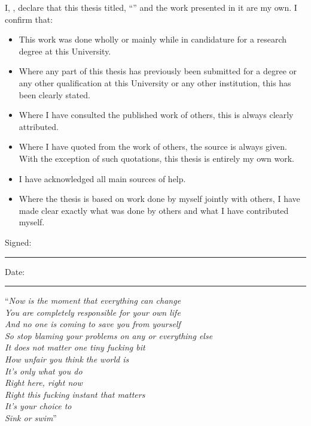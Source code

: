 \documentclass[
11pt, %
english, %
singlespacing, %
headsepline, %
]{MastersDoctoralThesis} %
\begin{document}

\begin{declaration}
\addchaptertocentry{\authorshipname} %
\noindent I, \authorname, declare that this thesis titled, \enquote{\ttitle} and the work presented in it are my own. I confirm that:

\begin{itemize} 
\item This work was done wholly or mainly while in candidature for a research degree at this University.
\item Where any part of this thesis has previously been submitted for a degree or any other qualification at this University or any other institution, this has been clearly stated.
\item Where I have consulted the published work of others, this is always clearly attributed.
\item Where I have quoted from the work of others, the source is always given. With the exception of such quotations, this thesis is entirely my own work.
\item I have acknowledged all main sources of help.
\item Where the thesis is based on work done by myself jointly with others, I have made clear exactly what was done by others and what I have contributed myself.
\end{itemize}
 
\noindent Signed:\\
\rule[0.5em]{25em}{0.5pt} %
 
\noindent Date:\\
\rule[0.5em]{25em}{0.5pt} %
\end{declaration}

\cleardoublepage


\vspace*{0.2\textheight}

\noindent\enquote{\itshape Now is the moment that everything can change\\
You are completely responsible for your own life\\
And no one is coming to save you from yourself\\
So stop blaming your problems on any or everything else\\
It does not matter one tiny fucking bit\\
How unfair you think the world is\\
It's only what you do\\
Right here, right now\\
Right this fucking instant that matters\\
It's your choice to\\
Sink or swim}\bigbreak
\end{document}
